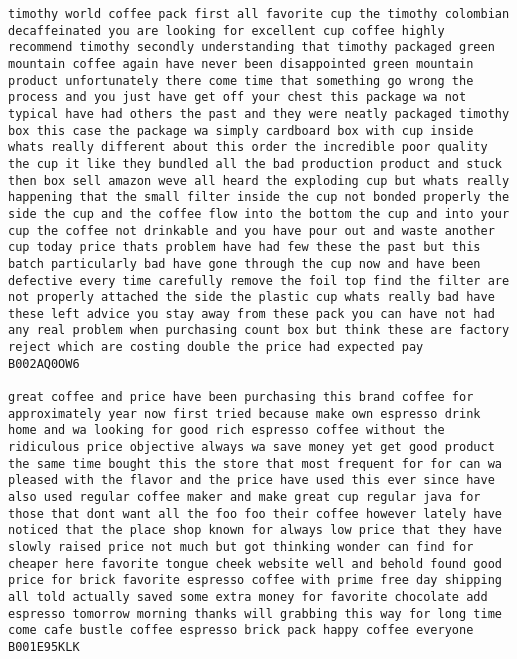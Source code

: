 \documentclass[11pt]{article}
\begin{document}
\begin{Verbatim}[commandchars=\\\{\}]
timothy world coffee pack first all favorite cup the timothy colombian decaffeinated you are looking for excellent cup coffee highly recommend timothy secondly understanding that timothy packaged green mountain coffee again have never been disappointed green mountain product unfortunately there come time that something go wrong the process and you just have get off your chest this package wa not typical have had others the past and they were neatly packaged timothy box this case the package wa simply cardboard box with cup inside whats really different about this order the incredible poor quality the cup it like they bundled all the bad production product and stuck then box sell amazon weve all heard the exploding cup but whats really happening that the small filter inside the cup not bonded properly the side the cup and the coffee flow into the bottom the cup and into your cup the coffee not drinkable and you have pour out and waste another cup today price thats problem have had few these the past but this batch particularly bad have gone through the cup now and have been defective every time carefully remove the foil top find the filter are not properly attached the side the plastic cup whats really bad have these left advice you stay away from these pack you can have not had any real problem when purchasing count box but think these are factory reject which are costing double the price had expected pay
B002AQ0OW6

great coffee and price have been purchasing this brand coffee for approximately year now first tried because make own espresso drink home and wa looking for good rich espresso coffee without the ridiculous price objective always wa save money yet get good product the same time bought this the store that most frequent for for can wa pleased with the flavor and the price have used this ever since have also used regular coffee maker and make great cup regular java for those that dont want all the foo foo their coffee however lately have noticed that the place shop known for always low price that they have slowly raised price not much but got thinking wonder can find for cheaper here favorite tongue cheek website well and behold found good price for brick favorite espresso coffee with prime free day shipping all told actually saved some extra money for favorite chocolate add espresso tomorrow morning thanks will grabbing this way for long time come cafe bustle coffee espresso brick pack happy coffee everyone
B001E95KLK


    \end{Verbatim}
\end{document}

